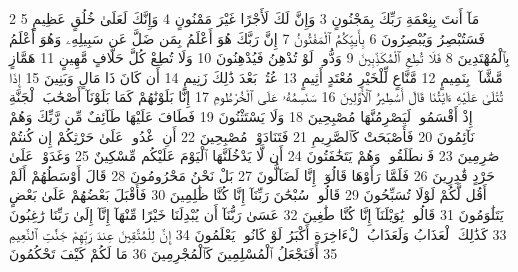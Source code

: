 {\tiny\colorbox{cl_aya}{2}} مَآ أَنتَ بِنِعْمَةِ رَبِّكَ بِمَجْنُونٍ
{\tiny\colorbox{cl_aya}{3}} وَإِنَّ لَكَ لَأَجْرًا غَيْرَ مَمْنُونٍ
{\tiny\colorbox{cl_aya}{4}} وَإِنَّكَ لَعَلَىٰ خُلُقٍ عَظِيمٍ
{\tiny\colorbox{cl_aya}{5}} فَسَتُبْصِرُ وَيُبْصِرُونَ
{\tiny\colorbox{cl_aya}{6}} بِأَييِّكُمُ ٱلْمَفْتُونُ
{\tiny\colorbox{cl_aya}{7}} إِنَّ رَبَّكَ هُوَ أَعْلَمُ بِمَن ضَلَّ عَن سَبِيلِهِۦ وَهُوَ أَعْلَمُ بِٱلْمُهْتَدِينَ
{\tiny\colorbox{cl_aya}{8}} فَلَا تُطِعِ ٱلْمُكَذِّبِينَ
{\tiny\colorbox{cl_aya}{9}} وَدُّوا۟ لَوْ تُدْهِنُ فَيُدْهِنُونَ
{\tiny\colorbox{cl_aya}{10}} وَلَا تُطِعْ كُلَّ حَلَّافٍ مَّهِينٍ
{\tiny\colorbox{cl_aya}{11}} هَمَّازٍ مَّشَّآءٍۭ بِنَمِيمٍ
{\tiny\colorbox{cl_aya}{12}} مَّنَّاعٍ لِّلْخَيْرِ مُعْتَدٍ أَثِيمٍ
{\tiny\colorbox{cl_aya}{13}} عُتُلٍّۭ بَعْدَ ذَٰلِكَ زَنِيمٍ
{\tiny\colorbox{cl_aya}{14}} أَن كَانَ ذَا مَالٍ وَبَنِينَ
{\tiny\colorbox{cl_aya}{15}} إِذَا تُتْلَىٰ عَلَيْهِ ءَايَٰتُنَا قَالَ أَسَٰطِيرُ ٱلْأَوَّلِينَ
{\tiny\colorbox{cl_aya}{16}} سَنَسِمُهُۥ عَلَى ٱلْخُرْطُومِ
{\tiny\colorbox{cl_aya}{17}} إِنَّا بَلَوْنَٰهُمْ كَمَا بَلَوْنَآ أَصْحَٰبَ ٱلْجَنَّةِ إِذْ أَقْسَمُوا۟ لَيَصْرِمُنَّهَا مُصْبِحِينَ
{\tiny\colorbox{cl_aya}{18}} وَلَا يَسْتَثْنُونَ
{\tiny\colorbox{cl_aya}{19}} فَطَافَ عَلَيْهَا طَآئِفٌ مِّن رَّبِّكَ وَهُمْ نَآئِمُونَ
{\tiny\colorbox{cl_aya}{20}} فَأَصْبَحَتْ كَٱلصَّرِيمِ
{\tiny\colorbox{cl_aya}{21}} فَتَنَادَوْا۟ مُصْبِحِينَ
{\tiny\colorbox{cl_aya}{22}} أَنِ ٱغْدُوا۟ عَلَىٰ حَرْثِكُمْ إِن كُنتُمْ صَٰرِمِينَ
{\tiny\colorbox{cl_aya}{23}} فَٱنطَلَقُوا۟ وَهُمْ يَتَخَٰفَتُونَ
{\tiny\colorbox{cl_aya}{24}} أَن لَّا يَدْخُلَنَّهَا ٱلْيَوْمَ عَلَيْكُم مِّسْكِينٌ
{\tiny\colorbox{cl_aya}{25}} وَغَدَوْا۟ عَلَىٰ حَرْدٍ قَٰدِرِينَ
{\tiny\colorbox{cl_aya}{26}} فَلَمَّا رَأَوْهَا قَالُوٓا۟ إِنَّا لَضَآلُّونَ
{\tiny\colorbox{cl_aya}{27}} بَلْ نَحْنُ مَحْرُومُونَ
{\tiny\colorbox{cl_aya}{28}} قَالَ أَوْسَطُهُمْ أَلَمْ أَقُل لَّكُمْ لَوْلَا تُسَبِّحُونَ
{\tiny\colorbox{cl_aya}{29}} قَالُوا۟ سُبْحَٰنَ رَبِّنَآ إِنَّا كُنَّا ظَٰلِمِينَ
{\tiny\colorbox{cl_aya}{30}} فَأَقْبَلَ بَعْضُهُمْ عَلَىٰ بَعْضٍ يَتَلَٰوَمُونَ
{\tiny\colorbox{cl_aya}{31}} قَالُوا۟ يَٰوَيْلَنَآ إِنَّا كُنَّا طَٰغِينَ
{\tiny\colorbox{cl_aya}{32}} عَسَىٰ رَبُّنَآ أَن يُبْدِلَنَا خَيْرًا مِّنْهَآ إِنَّآ إِلَىٰ رَبِّنَا رَٰغِبُونَ
{\tiny\colorbox{cl_aya}{33}} كَذَٰلِكَ ٱلْعَذَابُ وَلَعَذَابُ ٱلْءَاخِرَةِ أَكْبَرُ لَوْ كَانُوا۟ يَعْلَمُونَ
{\tiny\colorbox{cl_aya}{34}} إِنَّ لِلْمُتَّقِينَ عِندَ رَبِّهِمْ جَنَّٰتِ ٱلنَّعِيمِ
{\tiny\colorbox{cl_aya}{35}} أَفَنَجْعَلُ ٱلْمُسْلِمِينَ كَٱلْمُجْرِمِينَ
{\tiny\colorbox{cl_aya}{36}} مَا لَكُمْ كَيْفَ تَحْكُمُونَ
